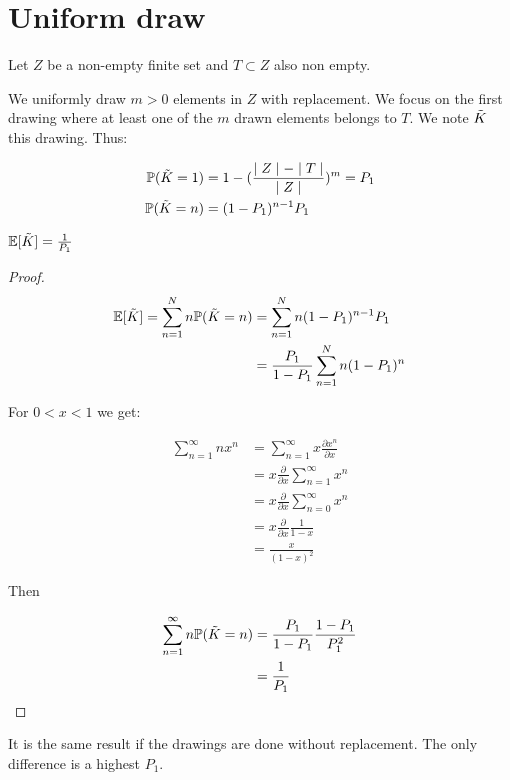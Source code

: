 \section{Uniform draw}\label{tirage}

Let $Z$ be a non-empty finite set and $T \subset Z$ also non empty.

We uniformly draw $m > 0$ elements in $Z$ with replacement. We focus on the first drawing where at least one of the $m$ drawn elements belongs to $T$. We note $\Tilde{K}$ this drawing. Thus:

\begin{align}
    \mathbb{P}(\Tilde{K} = 1) &= 1 - (\frac{\mid Z \mid-\mid T \mid}{\mid Z \mid})^m = P_1\\
    \mathbb{P}(\Tilde{K} = n) &= (1 - P_1)^{n-1} P_1
\end{align}

\begin{theorem}\label{theorem:stop}
$\mathbb{E}[\Tilde{K}] = \frac{1}{P_1}$
\end{theorem}



\begin{proof}
\begin{align*}
    \mathbb{E}[\Tilde{K}] = \sum_{n = 1}^{N} n \mathbb{P}(\Tilde{K} = n) &= \sum_{n = 1}^{N} n (1 - P_1)^{n-1} P_1\\
    &= \frac{P_1}{1 - P_1} \sum_{n = 1}^{N} n  (1 - P_1)^{n} 
\end{align*}

For $ 0 < x < 1$  we get:

\begin{align*}
    \sum_{n = 1}^{\infty} n x^n &= \sum_{n = 1}^{\infty} x \frac{\partial x^n}{\partial x}\\
                                &= x \frac{\partial }{\partial x} \sum_{n = 1}^{\infty} x^n\\
                                &= x \frac{\partial }{\partial x} \sum_{n = 0}^{\infty} x^n\\
                                &= x \frac{\partial }{\partial x} \frac{1}{1-x}\\
                                &= \frac{x}{(1-x)^2}
\end{align*}

Then 

\begin{align*}
    \sum_{n = 1}^{\infty} n \mathbb{P}(\Tilde{K} = n) &= \frac{P_1}{1 - P_1} \frac{1-P_1}{P_{1}^2}\\
    &= \frac{1}{P_1}
\end{align*}
\end{proof}

\begin{remark}
It is the same result if the drawings are done without replacement. The only difference is a highest $P_1$.
\end{remark}